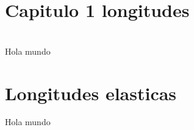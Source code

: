 \documentclass{book}
\begin{document}
\chapter{Capitulo 1 longitudes}

\the\paperwidth \\

\the\hoffset
Hola \hspace{3cm} mundo

\newlength{\margen}
\setlength\margen{10pt}

\the\margen

\addtolength{\margen}{5pt}
\the\margen

\addtolength{\margen}{-2pt}
\the\margen

\chapter{Longitudes elasticas}

Hola \hspace{3cm plus 1cm minus 5mm} mundo
\end{document}
